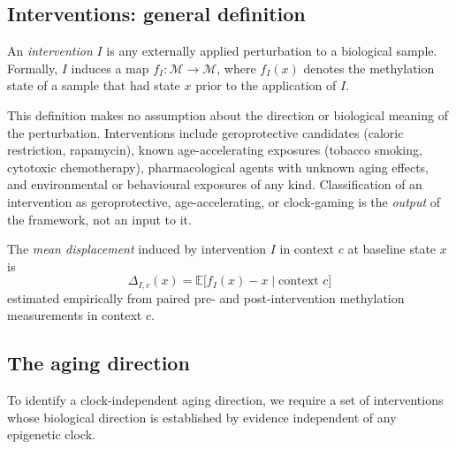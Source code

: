 \subsection{Interventions: general definition}
\label{sec:interventiondef}

\begin{definition}[Intervention]
An \emph{intervention} $I$ is any externally applied perturbation to a biological
sample. Formally, $I$ induces a map $f_I : \mathcal{M} \to \mathcal{M}$, where
$f_I(x)$ denotes the methylation state of a sample that had state $x$ prior to
the application of $I$.
\end{definition}

This definition makes no assumption about the direction or biological meaning of
the perturbation. Interventions include geroprotective candidates (caloric
restriction, rapamycin), known age-accelerating exposures (tobacco smoking,
cytotoxic chemotherapy), pharmacological agents with unknown aging effects, and
environmental or behavioural exposures of any kind. Classification of an
intervention as geroprotective, age-accelerating, or clock-gaming is the
\emph{output} of the framework, not an input to it.

The \emph{mean displacement} induced by intervention $I$ in context $c$ at baseline
state $x$ is
\begin{equation}
  \Delta_{I,c}(x) = \mathbb{E}\bigl[f_I(x) - x \;\big|\; \text{context } c\bigr]
  \label{eq:displacement}
\end{equation}
estimated empirically from paired pre- and post-intervention methylation
measurements in context $c$.

\subsection{The aging direction}
\label{sec:agingdirection}

To identify a clock-independent aging direction, we require a set of interventions
whose biological direction is established by evidence independent of any epigenetic
clock.

